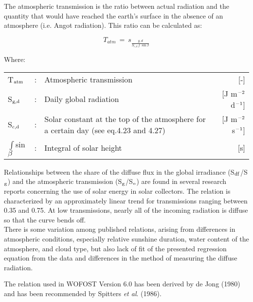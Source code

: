 The atmospheric transmission is the ratio between actual radiation and the quantity that
would have reached the earth's surface in the absence of an atmosphere (i.e. Angot
radiation). This ratio can be calculated as:

\begin{equation}
T _{atm} ~=~ s _{\frac{g,d}{S _{c,d} \int \sin \beta }}
\end{equation}

Where:\\
\begin{tabularx}{\textwidth}{llXr}
T$_{{\rm atm}}$ &:& Atmospheric transmission  & [-]\\
S$_{{\rm g,d}}$ &:& Daily global radiation  & [J m$^{{\rm -2}}$ d$^{{\rm -1}}$]\\
S$_{{\rm c,d}}$ &:& Solar constant at the top of the atmosphere for a certain day (see eq.4.23 and 4.27)  & [J m$^{{\rm -2}}$ s$^{{\rm -1}}$]\\
$\int$sin$\beta$  &:& Integral of solar height   & [s]\\
\end{tabularx}

Relationships between the share of the diffuse flux in the global irradiance (S$_{{\rm df}}$/S$_{{\rm g}}$) and the atmospheric transmission (S$_{{\rm g}}$/S$_{{\rm o}}$) are found in several research reports concerning the use
of solar energy in solar collectors. The relation is characterized by an approximately
linear trend for transmissions ranging between 0.35 and 0.75. At low transmissions,
nearly all of the incoming radiation is diffuse so that the curve bends off.\\
There is some variation among published relations, arising from differences in atmos\-pheric conditions, especially relative sunshine duration, water content of the atmosphere,
and cloud type, but also lack of fit of the presented regression equation from the data and
differences in the method of measuring the diffuse radiation.

The relation used in WOFOST Version 6.0 has been derived by de Jong (1980) and has
been recommended by Spitters {\it et al\/}. (1986).


